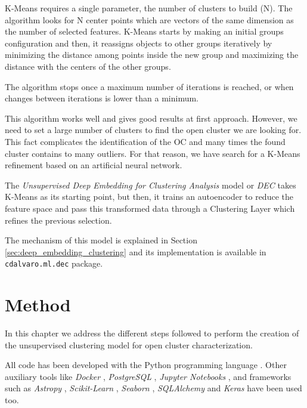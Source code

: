 \documentclass[11pt, a4paper, english]{book}
\begin{document}
K-Means requires a single parameter, the number of clusters to build (N).
The algorithm looks for N center points which are vectors of the same dimension as the number of selected features.
K-Means starts by making an initial groups configuration and then,
it reassigns objects to other groups iteratively by minimizing the distance among points
inside the new group and maximizing the distance with the centers of the other groups.

The algorithm stops once a maximum number of iterations is reached,
or when changes between iterations is lower than a minimum.

This algorithm works well and gives good results at first approach.
However, we need to set a large number of clusters to find the open cluster we are looking for.
This fact complicates the identification of the OC and many times the found cluster contains to many outliers.
For that reason, we have search for a K-Means refinement based on an artificial neural network.

The \emph{Unsupervised Deep Embedding for Clustering Analysis} model
or \emph{DEC} \cite{xie2016unsupervised} takes K-Means as its starting point,
but then, it trains an autoencoder to reduce the feature space
and pass this transformed data through a Clustering Layer which refines the previous selection.

The mechanism of this model is explained in Section \ref{sec:deep_embedding_clustering}
and its implementation is available in \verb|cdalvaro.ml.dec| package.

\chapter{Method}
\label{chap:method}

In this chapter we address the different steps followed to perform the creation of
the unsupervised clustering model for open cluster characterization.

All code has been developed with the Python programming language \cite{Python3}.
Other auxiliary tools like \emph{Docker} \cite{merkel2014docker},
\emph{PostgreSQL} \cite{postgresql}, \emph{Jupyter Notebooks} \cite{Kluyver2016jupyter},
and frameworks such as \emph{Astropy} \cite{astropy:2013} \cite{astropy:2018},
\emph{Scikit-Learn} \cite{scikit-learn}, \emph{Seaborn} \cite{michael_waskom_2017_883859},
\emph{SQLAlchemy} \cite{sqlalchemy} and \emph{Keras} \cite{chollet2015keras} have been used too.
\end{document}
